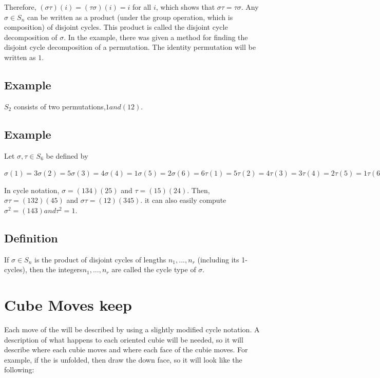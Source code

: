 Therefore, $(\sigma \tau)(i) = (\tau \sigma)(i) = i$ for all $i$, which shows that $\sigma \tau= \tau \sigma$.
Any $\sigma \in S_n$ can be written as a product (under the group operation, which is composition) of disjoint cycles.
This product is called the disjoint cycle decomposition of $\sigma.$ In the example, there was given a method for finding
the disjoint cycle decomposition of a permutation.
The identity permutation will be written as $1$.

\subsection{Example} $S_2$ consists of two permutations,$ 1 and (1 2).$

\subsection{Example} Let $\sigma, \tau \in S_6$ be defined by

$\sigma(1) = 3 \sigma(2) = 5 \sigma(3) = 4 \sigma(4) = 1 \sigma(5) = 2 \sigma(6) = 6
\tau(1) = 5 \tau(2) = 4 \tau(3) = 3 \tau(4) = 2 \tau(5) = 1 \tau(6) = 6$

In cycle notation, $\sigma = (1 3 4)(2 5)$ and $\tau = (1 5)(2 4)$. Then, $\sigma \tau= (1 3 2) (4 5)$ and $\sigma \tau= (1 2)(3 4 5)$. it
can also easily compute $\sigma^2 = (1 4 3) and \tau^2 = 1.$

\subsection{Definition}

 If $\sigma \in S_n$ is the product of disjoint cycles of lengths $n_1, . . . , n_r$ (including its 1-cycles),
then the integers$ n_1, . . . , n_r$ are called the cycle type of $\sigma$.
\pagebreak{}

\section{Cube Moves keep}

Each move of the \rubik{} will be described by using a slightly modified cycle notation. A description of what happens to each oriented cubie will be needed, so it will describe where each cubie moves and where each face of the cubie moves. For example, if the \rubik{} is unfolded, then draw the down face, so it will look like the following:


